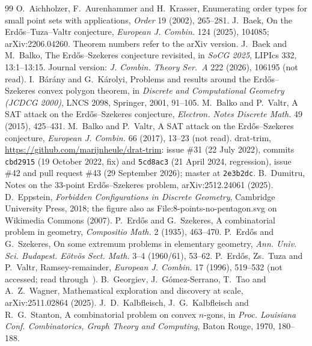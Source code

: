 \documentclass[10pt]{article}
\theoremstyle{definition}
\theoremstyle{remark}
\begin{document}
\begin{thebibliography}{99}\footnotesize
\setlength{\itemsep}{0pt}\setlength{\parsep}{0pt}
 O.~Aichholzer, F.~Aurenhammer and H.~Krasser, Enumerating order types for small point sets with
applications, \emph{Order} 19 (2002), 265--281.
 J.~Baek, On the Erd\H{o}s--Tuza--Valtr conjecture, \emph{European J. Combin.} 124 (2025), 104085;
arXiv:2206.04260. Theorem numbers refer to the arXiv version.
 J.~Baek and M.~Balko, The Erd\H{o}s--Szekeres conjecture revisited, in \emph{SoCG 2025}, LIPIcs 332,
13:1--13:15. Journal version: \emph{J. Combin. Theory Ser.~A} 222 (2026), 106195 (not read).
 I.~B\'ar\'any and G.~K\'arolyi, Problems and results around the Erd\H{o}s--Szekeres convex polygon
theorem, in \emph{Discrete and Computational Geometry (JCDCG 2000)}, LNCS 2098, Springer, 2001, 91--105.
 M.~Balko and P.~Valtr, A SAT attack on the Erd\H{o}s--Szekeres conjecture, \emph{Electron. Notes
Discrete Math.} 49 (2015), 425--431.
 M.~Balko and P.~Valtr, A SAT attack on the Erd\H{o}s--Szekeres conjecture, \emph{European J. Combin.}
66 (2017), 13--23 (not read).
 drat-trim, \url{https://github.com/marijnheule/drat-trim}: issue \#31 (22 July 2022), commits
\texttt{cbd2915} (19 October 2022, fix) and \texttt{5cd8ac3} (21 April 2024, regression), issue \#42 and pull request \#43
(29 September 2026); master at \texttt{2e3b2dc}.
 B.~Dumitru, Notes on the 33-point Erd\H{o}s--Szekeres problem, arXiv:2512.24061 (2025).
 D.~Eppstein, \emph{Forbidden Configurations in Discrete Geometry}, Cambridge University Press, 2018;
the figure also as File:8-points-no-pentagon.svg on Wikimedia Commons (2007).
 P.~Erd\H{o}s and G.~Szekeres, A combinatorial problem in geometry, \emph{Compositio Math.} 2 (1935),
463--470.
 P.~Erd\H{o}s and G.~Szekeres, On some extremum problems in elementary geometry, \emph{Ann. Univ. Sci.
Budapest. E\"otv\"os Sect. Math.} 3--4 (1960/61), 53--62.
 P.~Erd\H{o}s, Zs.~Tuza and P.~Valtr, Ramsey-remainder, \emph{European J. Combin.} 17 (1996), 519--532
(not accessed; read through~\cite{Bae25,BV15,BB25}).
 B.~Georgiev, J.~G\'omez-Serrano, T.~Tao and A.~Z.~Wagner, Mathematical exploration and discovery at
scale, arXiv:2511.02864 (2025).
 J.~D.~Kalbfleisch, J.~G.~Kalbfleisch and R.~G.~Stanton, A combinatorial problem on convex $n$-gons, in
\emph{Proc. Louisiana Conf. Combinatorics, Graph Theory and Computing}, Baton Rouge, 1970, 180--188.

\end{thebibliography}
\end{document}
